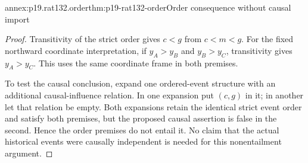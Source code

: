 \begin{annexitem}{annex:p19.rat132.order}{thm:p19-rat132-order}{Order consequence without causal import}
\begin{proof}
Transitivity of the strict order gives \(c<g\) from \(c<m<g\).
For the fixed northward coordinate interpretation, if
\(y_A>y_B\) and \(y_B>y_C\), transitivity gives \(y_A>y_C\).
This uses the same coordinate frame in both premises.

To test the causal conclusion, expand one ordered-event structure with an
additional causal-influence relation. In one expansion put \((c,g)\)
in it; in another let that relation be empty. Both expansions retain the
identical strict event order and satisfy both premises, but the proposed
causal assertion is false in the second. Hence the order premises do not
entail it. No claim that the actual historical events were causally
independent is needed for this nonentailment argument.
\end{proof}
\end{annexitem}

